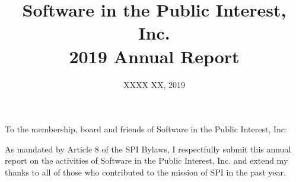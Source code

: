 \documentclass[a4paper]{report}
\begin{document}
\title{Software in the Public Interest, Inc.\\
2019 Annual Report}
\date{XXXX XX, 2019}

\maketitle

\newpage


\hspace{1em}

To the membership, board and friends of Software in the Public Interest, Inc:

As mandated by Article 8 of the SPI Bylaws, I respectfully submit this annual
report on the activities of Software in the Public Interest, Inc. and extend my
thanks to all of those who contributed to the mission of SPI in the past year.
\end{document}
